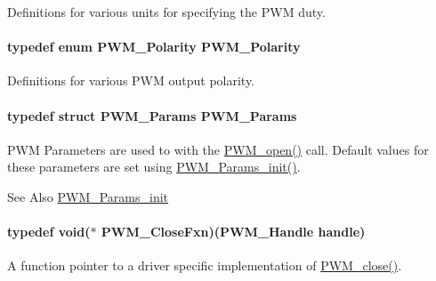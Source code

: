 Definitions for various units for specifying the P\-W\-M duty. 

\paragraph[{P\-W\-M\-\_\-\-Polarity}]{\setlength{\rightskip}{0pt plus 5cm}typedef enum {\bf P\-W\-M\-\_\-\-Polarity}  {\bf P\-W\-M\-\_\-\-Polarity}}\label{_p_w_m_8h_a15b860dd4dbdba68833b71c4d9f2b929}


Definitions for various P\-W\-M output polarity. 

\paragraph[{P\-W\-M\-\_\-\-Params}]{\setlength{\rightskip}{0pt plus 5cm}typedef struct {\bf P\-W\-M\-\_\-\-Params}  {\bf P\-W\-M\-\_\-\-Params}}\label{_p_w_m_8h_ac7349e4fc779fd744daf79b403269167}


P\-W\-M Parameters are used to with the \hyperlink{_p_w_m_8h_ac963beab0c5c6901bf852f175028aeaf}{P\-W\-M\-\_\-open()} call. Default values for these parameters are set using \hyperlink{_p_w_m_8h_acbdd3192f9f06bf689e4a3855926dcac}{P\-W\-M\-\_\-\-Params\-\_\-init()}. 

\begin{DoxySeeAlso}{See Also}
\hyperlink{_p_w_m_8h_acbdd3192f9f06bf689e4a3855926dcac}{P\-W\-M\-\_\-\-Params\-\_\-init} 
\end{DoxySeeAlso}
\paragraph[{P\-W\-M\-\_\-\-Close\-Fxn}]{\setlength{\rightskip}{0pt plus 5cm}typedef void($\ast$ P\-W\-M\-\_\-\-Close\-Fxn)({\bf P\-W\-M\-\_\-\-Handle} handle)}\label{_p_w_m_8h_a20139b14a696a3e8b0d13adb73760aac}


A function pointer to a driver specific implementation of \hyperlink{_p_w_m_8h_a0e0f5899b067d27653db566fb148db11}{P\-W\-M\-\_\-close()}. 

